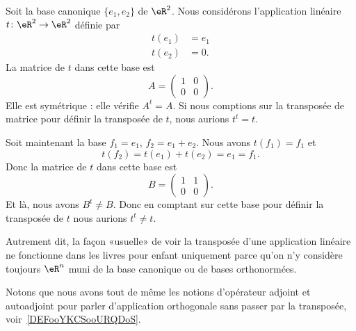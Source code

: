 \begin{example}
    Soit la base canonique \( \{ e_1,e_2 \}\) de \( \eR^2\). Nous considérons l'application linéaire \( t\colon \eR^2\to \eR^2\) définie par
    \begin{subequations}
        \begin{align}
            t(e_1)&=e_1\\
            t(e_2)&=0.
        \end{align}
    \end{subequations}
    La matrice de \( t\) dans cette base est
    \begin{equation}
        A=\begin{pmatrix}
            1    &   0    \\
            0    &   0
        \end{pmatrix}.
    \end{equation}
    Elle est symétrique : elle vérifie \( A^t=A\). Si nous comptions sur la transposée de matrice pour définir la transposée de \( t\), nous aurions \( t^t=t\).

    Soit maintenant la base \( f_1=e_1\), \( f_2=e_1+e_2\). Nous avons \( t(f_1)=f_1\) et
    \begin{equation}
        t(f_2)=t(e_1)+t(e_2)=e_1=f_1.
    \end{equation}
    Donc la matrice de \( t\) dans cette base est
    \begin{equation}
        B=\begin{pmatrix}
            1    &   1    \\
            0    &   0
        \end{pmatrix}.
    \end{equation}
    Et là, nous avons \( B^t\neq B\). Donc en comptant sur cette base pour définir la transposée de \( t\) nous aurions \( t^t\neq t\).
\end{example}

\begin{normaltext}      \label{NooMZVRooExWVKJ}
    Autrement dit, la façon «usuelle» de voir la transposée d'une application linéaire ne fonctionne dans les livres pour enfant uniquement parce qu'on n'y considère toujours \( \eR^n\) muni de la base canonique ou de bases orthonormées.

    Notons que nous avons tout de même les notions d'opérateur adjoint et autoadjoint pour parler d'application orthogonale sans passer par la transposée, voir~\ref{DEFooYKCSooURQDoS}.
\end{normaltext}

